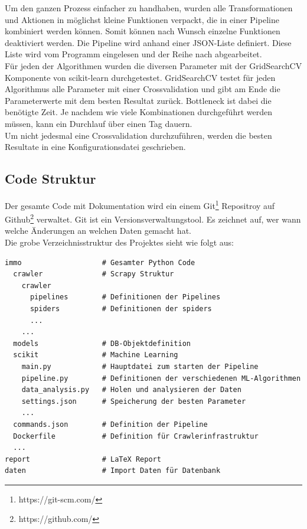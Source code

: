 Um den ganzen Prozess einfacher zu handhaben, wurden alle Transformationen und Aktionen in möglichst kleine Funktionen verpackt, die in einer Pipeline kombiniert werden können. Somit können nach Wunsch einzelne Funktionen deaktiviert werden. Die Pipeline wird anhand einer JSON-Liste definiert. Diese Liste wird vom Programm eingelesen und der Reihe nach abgearbeitet.\\[2ex]
%
Für jeden der Algorithmen wurden die diversen Parameter mit der GridSearchCV Komponente von scikit-learn durchgetestet. GridSearchCV testet für jeden Algorithmus alle Parameter mit einer Crossvalidation und gibt am Ende die Parameterwerte mit dem besten Resultat zurück. Bottleneck ist dabei die benötigte Zeit. Je nachdem wie viele Kombinationen durchgeführt werden müssen, kann ein Durchlauf über einen Tag dauern.\\
Um nicht jedesmal eine Crossvalidation durchzuführen, werden die besten Resultate in eine Konfigurationsdatei geschrieben.

\subsection{Code Struktur}
Der gesamte Code mit Dokumentation wird ein einem Git\footnote{https://git-scm.com/} Repositroy auf Github\footnote{https://github.com/} verwaltet. Git ist ein Versionsverwaltungstool. Es zeichnet auf, wer wann welche Änderungen an welchen Daten gemacht hat.\\
Die grobe Verzeichnisstruktur des Projektes sieht wie folgt aus:
\begin{verbatim}
immo                   # Gesamter Python Code
  crawler              # Scrapy Struktur
    crawler
      pipelines        # Definitionen der Pipelines
      spiders          # Definitionen der spiders
      ...
    ...
  models               # DB-Objektdefinition
  scikit               # Machine Learning
    main.py            # Hauptdatei zum starten der Pipeline
    pipeline.py        # Definitionen der verschiedenen ML-Algorithmen
    data_analysis.py   # Holen und analysieren der Daten
    settings.json      # Speicherung der besten Parameter
    ...
  commands.json        # Definition der Pipeline
  Dockerfile           # Definition für Crawlerinfrastruktur
  ...
report                 # LaTeX Report
daten                  # Import Daten für Datenbank
\end{verbatim}

